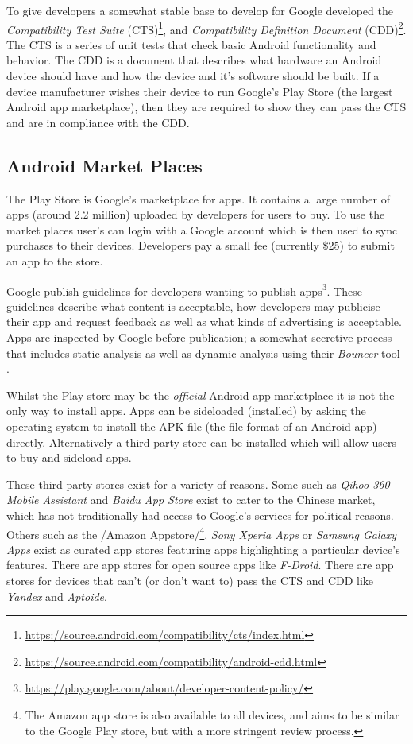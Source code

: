 \documentclass[thesis.tex]{subfiles}
\begin{document}
To give developers a somewhat stable base to develop for Google
developed the \emph{Compatibility Test Suite} (CTS)\footnote{\url{https://source.android.com/compatibility/cts/index.html}},
and \emph{Compatibility Definition Document} (CDD)\footnote{\url{https://source.android.com/compatibility/android-cdd.html}}.
The CTS is a series of unit tests that check basic Android functionality
and behavior. The CDD is a document that describes what hardware an
Android device should have and how the device and it's software should
be built. If a device manufacturer wishes their device to run Google's
Play Store (the largest Android app marketplace), then they are required
to show they can pass the CTS and are in compliance with the CDD.

\subsection{Android Market Places}\label{android-market-places}

The Play Store is Google's marketplace for apps. It contains a large
number of apps (around 2.2 million) uploaded by developers for users to
buy. To use the market places user's can login with a Google account
which is then used to sync purchases to their devices. Developers pay a
small fee (currently \$25) to submit an app to the store.

Google publish guidelines for developers wanting to publish
apps\footnote{\url{https://play.google.com/about/developer-content-policy/}}.
These guidelines describe what content is acceptable, how developers may
publicise their app and request feedback as well as what kinds of
advertising is acceptable. Apps are inspected by Google before
publication; a somewhat secretive process that includes static analysis
as well as dynamic analysis using their \emph{Bouncer} tool
\cite{oberheide_dissecting_2012}.

Whilst the Play store may be the \emph{official} Android app marketplace
it is not the only way to install apps. Apps can be sideloaded
(installed) by asking the operating system to install the APK file (the
file format of an Android app) directly. Alternatively a third-party
store can be installed which will allow users to buy and sideload apps.

These third-party stores exist for a variety of reasons. Some such as
\emph{Qihoo 360 Mobile Assistant} and \emph{Baidu App Store} exist to
cater to the Chinese market, which has not traditionally had access to
Google's services for political reasons. Others such as the /Amazon
Appstore/\footnote{The Amazon app store is also available to all
  devices, and aims to be similar to the Google Play store, but with a
  more stringent review process.}, \emph{Sony Xperia Apps} or
\emph{Samsung Galaxy Apps} exist as curated app stores featuring apps
highlighting a particular device's features. There are app stores for
open source apps like \emph{F-Droid}. There are app stores for devices
that can't (or don't want to) pass the CTS and CDD like \emph{Yandex}
and \emph{Aptoide}.
\end{document}
